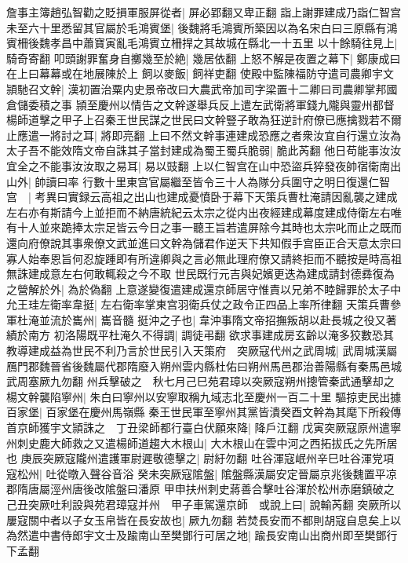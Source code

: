 詹事主簿趙弘智勸之貶損軍服屏從者|{
	屏必郢翻又卑正翻}
詣上謝罪建成乃詣仁智宫未至六十里悉留其官屬於毛鴻賓堡|{
	後魏將毛鴻賓所築因以為名宋白曰三原縣有鴻賓柵後魏孝昌中蕭寶寅亂毛鴻賓立柵捍之其故城在縣北一十五里}
以十餘騎往見上|{
	騎奇寄翻}
叩頭謝罪奮身自擲幾至於絶|{
	幾居依翻}
上怒不解是夜置之幕下|{
	鄭康成曰在上曰幕幕或在地展陳於上}
飼以麥飯|{
	飼祥吏翻}
使殿中監陳福防守遣司農卿宇文頴馳召文幹|{
	漢初置治粟内史景帝改曰大農武帝加司字梁置十二卿曰司農卿掌邦國倉儲委積之事}
頴至慶州以情告之文幹遂舉兵反上遣左武衛將軍錢九隴與靈州都督楊師道擊之甲子上召秦王世民謀之世民曰文幹豎子敢為狂逆計府僚已應擒戮若不爾止應遣一將討之耳|{
	將即亮翻}
上曰不然文幹事連建成恐應之者衆汝宜自行還立汝為太子吾不能效隋文帝自誅其子當封建成為蜀王蜀兵脆弱|{
	脆此芮翻}
他日苟能事汝汝宜全之不能事汝汝取之易耳|{
	易以豉翻}
上以仁智宫在山中恐盜兵猝發夜帥宿衛南出山外|{
	帥讀曰率}
行數十里東宫官屬繼至皆令三十人為隊分兵圍守之明日復還仁智宫　|{
	考異曰實録云高祖之出山也建成憂憤卧于幕下天策兵曹杜淹請因亂襲之建成左右亦有斯請今上並拒而不納唐統紀云太宗之從内出夜經建成幕度建成侍衛左右唯有十人並來跪捧太宗足皆云今日之事一聽王旨若遣屏除今其時也太宗叱而止之既而還向府僚說其事衆僚文武並進曰文幹為儲君作逆天下共知假手宫臣正合天意太宗曰寡人始奉恩旨何忍旋踵即有所違卿與之言必無此理府僚又請終拒而不聽按是時高祖無誅建成意左右何敢輒殺之今不取}
世民既行元吉與妃嬪更迭為建成請封德彞復為之營解於外|{
	為於偽翻}
上意遂變復遣建成還京師居守惟責以兄弟不睦歸罪於太子中允王珪左衛率韋挺|{
	左右衛率掌東宫羽衛兵仗之政令正四品上率所律翻}
天策兵曹參軍杜淹並流於巂州|{
	巂音髓}
挺沖之子也|{
	韋沖事隋文帝招撫叛胡以赴長城之役又著績於南方}
初洛陽既平杜淹久不得調|{
	調徒弔翻}
欲求事建成房玄齡以淹多狡數恐其教導建成益為世民不利乃言於世民引入天策府　突厥寇代州之武周城|{
	武周城漢屬鴈門郡魏晉省後魏屬代郡隋廢入朔州雲内縣杜佑曰朔州馬邑郡治善陽縣有秦馬邑城武周塞厥九勿翻}
州兵擊破之　秋七月己巳苑君璋以突厥寇朔州摠管秦武通擊却之　楊文幹襲陷寧州|{
	朱白曰寧州以安寧取稱九域志北至慶州一百二十里}
驅掠吏民出據百家堡|{
	百家堡在慶州馬嶺縣}
秦王世民軍至寧州其黨皆潰癸酉文幹為其麾下所殺傳首京師獲宇文頴誅之　丁丑梁師都行臺白伏願來降|{
	降戶江翻}
戊寅突厥寇原州遣寧州刺史鹿大師救之又遣楊師道趨大木根山|{
	大木根山在雲中河之西拓拔氏之先所居也}
庚辰突厥寇隴州遣護軍尉遲敬德擊之|{
	尉紆勿翻}
吐谷渾寇岷州辛巳吐谷渾党項寇松州|{
	吐從暾入聲谷音浴}
癸未突厥寇隂盤|{
	隂盤縣漢屬安定晉屬京兆後魏置平凉郡隋唐屬涇州唐後改隂盤曰潘原}
甲申扶州刺史蔣善合擊吐谷渾於松州赤磨鎮破之　己丑突厥吐利設與苑君璋寇并州　甲子車駕還京師　或說上曰|{
	說輸芮翻}
突厥所以屢寇關中者以子女玉帛皆在長安故也|{
	厥九勿翻}
若焚長安而不都則胡寇自息矣上以為然遣中書侍郎宇文士及踰南山至樊鄧行可居之地|{
	踰長安南山出商州即至樊鄧行下孟翻}
